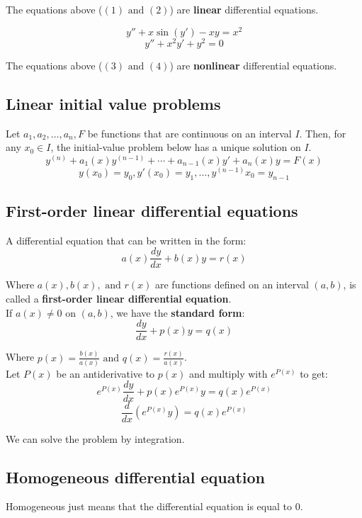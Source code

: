 \documentclass[11pt]{article}
\begin{document}
The equations above (\((1) \text{ and } (2)\)) are \textbf{linear} differential equations.

\[y'' + x \sin (y') - xy = x^2 \tag{3}\]
\[y'' + x^2y' + y^2 = 0 \tag{4}\]

The equations above (\((3) \text{ and } (4)\)) are \textbf{nonlinear} differential equations.

\subsection{Linear initial value problems}
\label{sec:orge34e5c2}
Let \(a_1, a_2, \ldots, a_n, F\) be functions that are continuous on an interval \(I\). Then, for any \(x_0 \in I\), the initial-value problem below has a unique solution on \(I\).
\[y^{(n)} + a_1 (x) y^{(n - 1)} + \cdots + a_{n - 1}(x) y' + a_n (x) y = F(x)\]
\[y(x_0) = y_0, y'(x_0) = y_1, \ldots, y^{(n - 1)} x_0 = y_{n - 1}\]

\newpage

\subsection{First-order linear differential equations}
\label{sec:org15df989}
A differential equation that can be written in the form:
\[a(x) \frac{dy}{dx} + b(x)y = r(x)\]

Where \(a(x), b(x), \text{ and } r(x)\) are functions defined on an interval \((a, b)\), is called a \textbf{first-order linear differential equation}.
\\[0pt]

If \(a(x) \ne 0\) on \((a, b)\), we have the \textbf{standard form}:
\[\frac{dy}{dx} + p(x) y = q(x)\]

Where \(p(x) = \frac{b(x)}{a(x)} \text{ and } q(x) = \frac{r(x)}{a(x)}\).
\\[0pt]

Let \(P(x)\) be an antiderivative to \(p(x)\) and multiply with \(e^{P(x)}\) to get:
\[e^{P(x)} \frac{dy}{dx} + p(x) e^{P(x)} y = q(x) e^{P(x)}\]
\[\frac{d}{dx} \left( e^{P(x)} y \right) = q(x) e^{P(x)}\]

We can solve the problem by integration.

\subsection{Homogeneous differential equation}
\label{sec:org4e93fb4}
Homogeneous just means that the differential equation is equal to 0.
\end{document}
